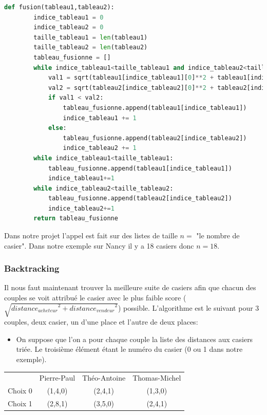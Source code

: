 \documentclass[11pt]{article}
\begin{document}
\begin{lstlisting}[language=python, caption={Fusion de deux tableaux triés selon l'ordre choisi précédemment}]
def fusion(tableau1,tableau2):
        indice_tableau1 = 0
        indice_tableau2 = 0    
        taille_tableau1 = len(tableau1)
        taille_tableau2 = len(tableau2)
        tableau_fusionne = []
        while indice_tableau1<taille_tableau1 and indice_tableau2<taille_tableau2:
            val1 = sqrt(tableau1[indice_tableau1][0]**2 + tableau1[indice_tableau1][1]**2)
            val2 = sqrt(tableau2[indice_tableau2][0]**2 + tableau2[indice_tableau2][1]**2)
            if val1 < val2:
                tableau_fusionne.append(tableau1[indice_tableau1])
                indice_tableau1 += 1
            else:
                tableau_fusionne.append(tableau2[indice_tableau2])
                indice_tableau2 += 1
        while indice_tableau1<taille_tableau1:
            tableau_fusionne.append(tableau1[indice_tableau1])
            indice_tableau1+=1
        while indice_tableau2<taille_tableau2:
            tableau_fusionne.append(tableau2[indice_tableau2])
            indice_tableau2+=1
        return tableau_fusionne
\end{lstlisting}

Dans notre projet l'appel est fait sur des listes de taille $n=$ "le nombre de casier". Dans notre exemple sur Nancy il y a 18 casiers donc $n=18$. 

\subsubsection{Backtracking}
Il nous faut maintenant trouver la meilleure suite de casiers afin que chacun des couples se voit attribué le casier avec le plus faible score ($\sqrt{{distance_{acheteur}}^2+{distance_{vendeur}}^2}$) possible.
L'algorithme est le suivant pour 3 couples, deux casier, un d'une place et l'autre de deux places:
\begin{itemize}
    \item On suppose que l'on a pour chaque couple la liste des distances aux casiers triée. Le troisième élément étant le numéro du casier (0 ou 1 dans notre exemple).
\end{itemize}

\begin{center}
\hspace{-1.75cm}\begin{tabular}{ c c| c| c }
    & Pierre-Paul & Théo-Antoine & Thomas-Michel \\
    Choix 0 & (1,4,0) & (2,4,1) & (1,3,0) \\
    Choix 1 &  (2,8,1) & (3,5,0) & (2,4,1) \\
 \end{tabular}
\end{center}
\end{document}
